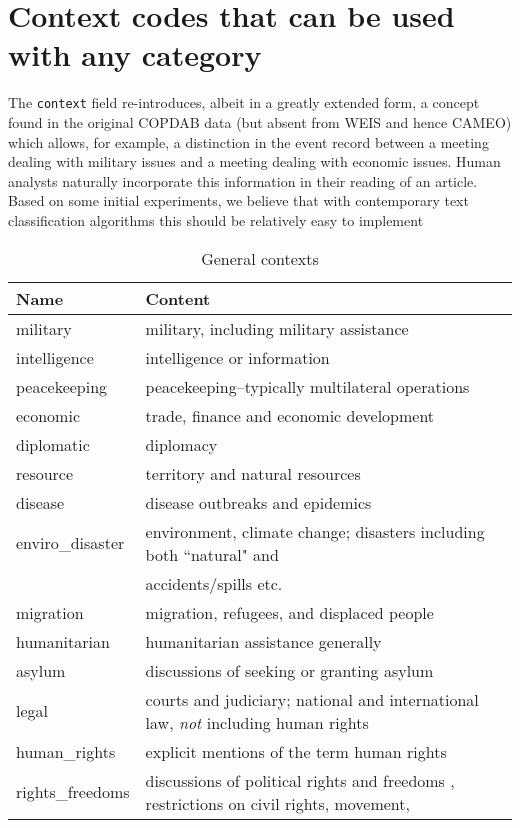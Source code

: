 \documentclass[11pt]{report}
\newcommand{\txt}[1]{\texttt{#1}}
\begin{document}
\section{Context codes that can be used with any category}

The \txt{context} field re-introduces, albeit in a greatly extended form, a concept found in the original COPDAB data (but absent from WEIS and hence CAMEO) which allows, for example, a distinction in the event record between a meeting dealing with military issues and a meeting dealing with economic issues. Human analysts naturally incorporate this information in their reading of an article. Based on some initial experiments, we believe that with contemporary text classification algorithms this should be relatively easy to implement

\begin{table}[htp]
\caption{General contexts }
\begin{center}
\begin{tabular}{|l|l|}
\hline
Name & Content \\
\hline
military & military, including military assistance \\
intelligence & intelligence or information \\
peacekeeping & peacekeeping–typically multilateral operations \\
economic & trade, finance and economic development \\
diplomatic & diplomacy \\
resource & territory and natural resources \\
disease & disease outbreaks and epidemics \\
enviro\_disaster & environment, climate change; disasters including both ``natural" and \\&\hspace{6pt} accidents/spills etc.\\
migration  & migration, refugees, and displaced people \\
humanitarian & humanitarian assistance generally \\
asylum & discussions of seeking or granting asylum \\
legal & courts and judiciary; national and international law, \emph{not} including human rights \\ 
human\_rights & explicit mentions of the term human rights \\ 
rights\_freedoms & discussions of political rights and freedoms , restrictions on civil rights, movement, \\

\end{tabular}
\end{center}
\end{table}
\end{document}

